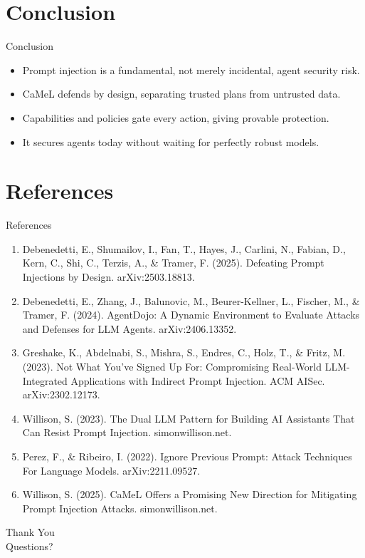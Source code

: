 \documentclass[10pt]{beamer}
\begin{document}
\section{Conclusion}
\begin{frame}{Conclusion}
\begin{itemize}
  \item Prompt injection is a fundamental, not merely incidental, agent security risk.
  \item CaMeL defends by design, separating trusted plans from untrusted data.
  \item Capabilities and policies gate every action, giving provable protection.
  \item It secures agents today without waiting for perfectly robust models.
\end{itemize}
\end{frame}
\section{References}
\begin{frame}[allowframebreaks]{References}
  \footnotesize
  \begin{enumerate}
    \item Debenedetti, E., Shumailov, I., Fan, T., Hayes, J., Carlini, N., Fabian, D., Kern, C., Shi, C., Terzis, A., \& Tramer, F. (2025). Defeating Prompt Injections by Design. arXiv:2503.18813.
    \item Debenedetti, E., Zhang, J., Balunovic, M., Beurer-Kellner, L., Fischer, M., \& Tramer, F. (2024). AgentDojo: A Dynamic Environment to Evaluate Attacks and Defenses for LLM Agents. arXiv:2406.13352.
    \item Greshake, K., Abdelnabi, S., Mishra, S., Endres, C., Holz, T., \& Fritz, M. (2023). Not What You've Signed Up For: Compromising Real-World LLM-Integrated Applications with Indirect Prompt Injection. ACM AISec. arXiv:2302.12173.
    \item Willison, S. (2023). The Dual LLM Pattern for Building AI Assistants That Can Resist Prompt Injection. simonwillison.net.
    \item Perez, F., \& Ribeiro, I. (2022). Ignore Previous Prompt: Attack Techniques For Language Models. arXiv:2211.09527.
    \item Willison, S. (2025). CaMeL Offers a Promising New Direction for Mitigating Prompt Injection Attacks. simonwillison.net.
  \end{enumerate}
\end{frame}
\begin{frame}[plain]
  \begin{center}
    {\Huge Thank You}\\[1em]
    {\large Questions?}
  \end{center}
\end{frame}
\end{document}
